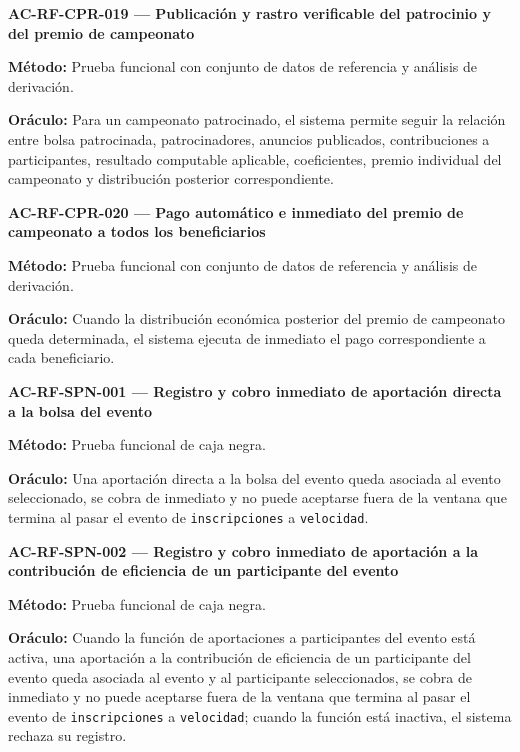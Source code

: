 \documentclass[10pt,letterpaper]{article}
\begin{document}
\noindent\textbf{AC-RF-CPR-019 --- Publicación y rastro verificable del patrocinio y del premio de campeonato}\par
\textbf{Método:} Prueba funcional con conjunto de datos de referencia y análisis de derivación.\par
\textbf{Oráculo:} Para un campeonato patrocinado, el sistema permite seguir la relación entre bolsa patrocinada, patrocinadores, anuncios publicados, contribuciones a participantes, resultado computable aplicable, coeficientes, premio individual del campeonato y distribución posterior correspondiente.\par\vspace{0.45em}
\noindent\textbf{AC-RF-CPR-020 --- Pago automático e inmediato del premio de campeonato a todos los beneficiarios}\par
\textbf{Método:} Prueba funcional con conjunto de datos de referencia y análisis de derivación.\par
\textbf{Oráculo:} Cuando la distribución económica posterior del premio de campeonato queda determinada, el sistema ejecuta de inmediato el pago correspondiente a cada beneficiario.\par\vspace{0.45em}
\noindent\textbf{AC-RF-SPN-001 --- Registro y cobro inmediato de aportación directa a la bolsa del evento}\par
\textbf{Método:} Prueba funcional de caja negra.\par
\textbf{Oráculo:} Una aportación directa a la bolsa del evento queda asociada al evento seleccionado, se cobra de inmediato y no puede aceptarse fuera de la ventana que termina al pasar el evento de \texttt{inscripciones} a \texttt{velocidad}.\par\vspace{0.45em}
\noindent\textbf{AC-RF-SPN-002 --- Registro y cobro inmediato de aportación a la contribución de eficiencia de un participante del evento}\par
\textbf{Método:} Prueba funcional de caja negra.\par
\textbf{Oráculo:} Cuando la función de aportaciones a participantes del evento está activa, una aportación a la contribución de eficiencia de un participante del evento queda asociada al evento y al participante seleccionados, se cobra de inmediato y no puede aceptarse fuera de la ventana que termina al pasar el evento de \texttt{inscripciones} a \texttt{velocidad}; cuando la función está inactiva, el sistema rechaza su registro.\par\vspace{0.45em}
\end{document}
